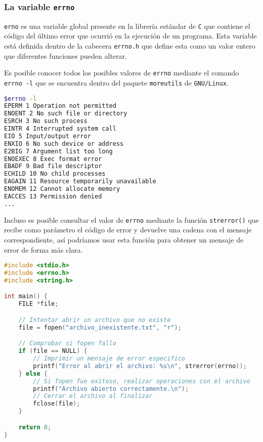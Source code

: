 \subsubsection*{La variable \texttt{errno}}
\texttt{erno} es una variable global presente en la librería estándar de \texttt{C} que contiene el código del último error que ocurrió en la ejecución de un programa. Esta variable está definida dentro de la cabecera \texttt{errno.h} que define esta como un valor entero que diferentes funciones pueden alterar.

Es posible conocer todos los posibles valores de \texttt{errno} mediante el comando \texttt{errno -l} que se encuentra dentro del paquete \texttt{moreutils} de \texttt{GNU/Linux}.

\begin{lstlisting}[language=bash, style=CodeStyle]
$errno -l
EPERM 1 Operation not permitted
ENOENT 2 No such file or directory
ESRCH 3 No such process
EINTR 4 Interrupted system call
EIO 5 Input/output error
ENXIO 6 No such device or address
E2BIG 7 Argument list too long
ENOEXEC 8 Exec format error
EBADF 9 Bad file descriptor
ECHILD 10 No child processes
EAGAIN 11 Resource temporarily unavailable
ENOMEM 12 Cannot allocate memory
EACCES 13 Permission denied
...
\end{lstlisting}

Incluso es posible consultar el valor de \texttt{errno} mediante la función \texttt{strerror()} que recibe como parámetro el código de error y devuelve una cadena con el mensaje correspondiente, así podríamos usar esta función para obtener un mensaje de error de forma más clara.
\begin{lstlisting}[language=C, style=CodeStyle, caption={Ejemplo de uso de errno y strerror}, label=lst:errno]
#include <stdio.h>
#include <errno.h>
#include <string.h>

int main() {
    FILE *file;

    // Intentar abrir un archivo que no existe
    file = fopen("archivo_inexistente.txt", "r");

    // Comprobar si fopen fallo
    if (file == NULL) {
        // Imprimir un mensaje de error especifico
        printf("Error al abrir el archivo: %s\n", strerror(errno));
    } else {
        // Si fopen fue exitoso, realizar operaciones con el archivo
        printf("Archivo abierto correctamente.\n");
        // Cerrar el archivo al finalizar
        fclose(file);
    }

    return 0;
}
\end{lstlisting}

